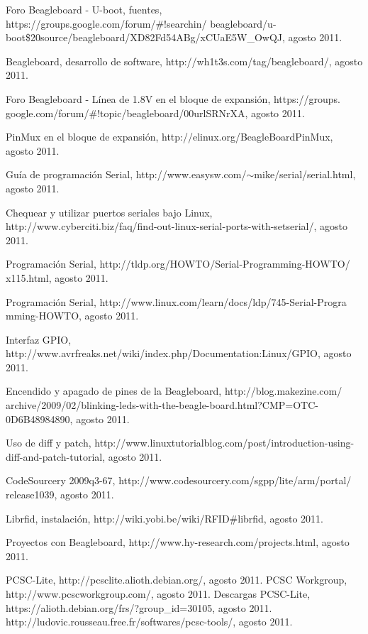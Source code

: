 \begin{thebibliography}{200}
\bibitem{} Foro Beagleboard - U-boot, fuentes, https://groups.google.com/forum/\#!searchin/
beagleboard/u-boot\$20source/beagleboard/XD82Fd54ABg/xCUaE5W\_OwQJ, agosto 2011.

\bibitem{} Beagleboard, desarrollo de software, http://wh1t3s.com/tag/beagleboard/, agosto 2011.

\bibitem{} Foro Beagleboard - Línea de 1.8V en el bloque de expansión, https://groups.\\
google.com/forum/\#!topic/beagleboard/00urlSRNrXA, agosto 2011.

\bibitem{} PinMux en el bloque de expansión, http://elinux.org/BeagleBoardPinMux, agosto 2011.

\bibitem{} Guía de programación Serial, http://www.easysw.com/$\sim$mike/serial/serial.html, agosto 2011.

\bibitem{} Chequear y utilizar puertos seriales bajo Linux, http://www.cyberciti.biz/faq/find-out-linux-serial-ports-with-setserial/, agosto 2011.

\bibitem{} Programación Serial, http://tldp.org/HOWTO/Serial-Programming-HOWTO/\\
x115.html, agosto 2011.

\bibitem{} Programación Serial, http://www.linux.com/learn/docs/ldp/745-Serial-Progra\\
mming-HOWTO, agosto 2011.

\bibitem{} Interfaz GPIO, http://www.avrfreaks.net/wiki/index.php/Documentation:Linux/GPIO, agosto 2011.

\bibitem{} Encendido y apagado de pines de la Beagleboard, http://blog.makezine.com/\\
archive/2009/02/blinking-leds-with-the-beagle-board.html?CMP=OTC-0D6B48984890, agosto 2011.

\bibitem{} Uso de diff y patch, http://www.linuxtutorialblog.com/post/introduction-using-diff-and-patch-tutorial, agosto 2011.

\bibitem{} CodeSourcery 2009q3-67, http://www.codesourcery.com/sgpp/lite/arm/portal/\\
release1039, agosto 2011.

\bibitem{} Librfid, instalación, http://wiki.yobi.be/wiki/RFID\#librfid, agosto 2011.

\bibitem{} Proyectos con Beagleboard, http://www.hy-research.com/projects.html, agosto 2011.




 PCSC-Lite, http://pcsclite.alioth.debian.org/, agosto 2011.
 PCSC Workgroup, http://www.pcscworkgroup.com/, agosto 2011.
 Descargas PCSC-Lite, https://alioth.debian.org/frs/?group\_id=30105, agosto 2011.
 http://ludovic.rousseau.free.fr/softwares/pcsc-tools/, agosto 2011.


\end{thebibliography}
